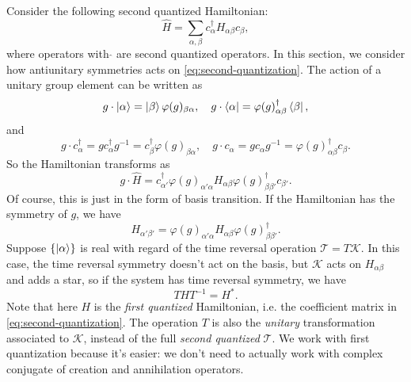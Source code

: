 \documentclass[hyperref, a4paper]{article}
\begin{document}
Consider the following second quantized Hamiltonian:
\begin{equation}
    \hat{H} = \sum_{\alpha, \beta} c^\dagger_\alpha H_{\alpha \beta} c_\beta,
    \label{eq:second-quantization}
\end{equation}
where operators with $\hat{}$ are second quantized operators. In this section, we consider how 
antiunitary symmetries acts on \eqref{eq:second-quantization}. The action of a unitary group element can be 
written as 
\begin{equation}
    g \cdot \ket{\alpha} = \ket{\beta} \varphi(g)_{\beta \alpha}, \quad 
    g \cdot \bra{\alpha} = \varphi(g)^\dagger_{\alpha \beta} \bra{\beta}, 
\end{equation}
and 
\begin{equation}
    g \cdot c^\dagger_\alpha = g c^\dagger_\alpha g^{-1} = c^\dagger_\beta \varphi(g)_{\beta \alpha}, \quad 
    g \cdot c_\alpha = g c_\alpha g^{-1} = \varphi(g)^\dagger_{\alpha \beta} c_\beta.
\end{equation}
So the Hamiltonian transforms as 
\begin{equation}
    g \cdot \hat{H} = c^\dagger_{\alpha'} \varphi(g)_{\alpha' \alpha} H_{\alpha \beta} \varphi(g)^\dagger_{\beta \beta'} c_{\beta'}.
\end{equation}
Of course, this is just in the form of basis transition. If the Hamiltonian has the symmetry of $g$, we have 
\begin{equation}
    H_{\alpha' \beta'} = \varphi(g)_{\alpha' \alpha} H_{\alpha \beta} \varphi(g)^\dagger_{\beta \beta'}.
\end{equation}
Suppose $\{\ket{\alpha}\}$ is real with regard of the time reversal operation $\mathcal{T} = T \mathcal{K}$.
In this case, the time reversal symmetry doesn't act on the basis, but $\mathcal{K}$ acts on $H_{\alpha \beta}$
and adds a star, so if the system has time reversal symmetry, we have 
\begin{equation}
    T H T^{-1} = {H}^*.
    \label{eq:time-reversal-first-quantization}
\end{equation}
Note that here $H$ is the \emph{first quantized} Hamiltonian, i.e. the coefficient matrix 
in \eqref{eq:second-quantization}. The operation $T$ is also the \emph{unitary} transformation associated 
to $\mathcal{K}$, instead of the full \emph{second quantized} $\mathcal{T}$. We work with first quantization
because it's easier: we don't need to actually work with complex conjugate of creation and annihilation operators.
\end{document}
